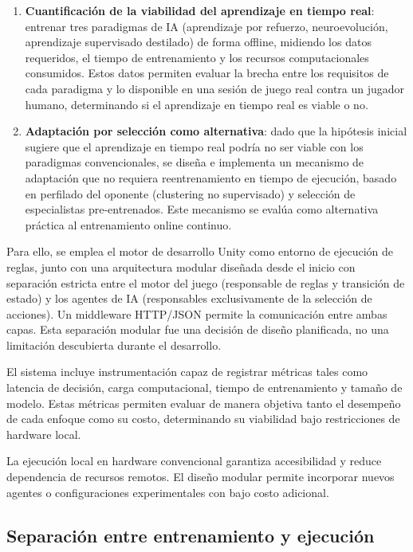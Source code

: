 \begin{enumerate}
    \item \textbf{Cuantificación de la viabilidad del aprendizaje en tiempo real}: entrenar tres paradigmas de IA (aprendizaje por refuerzo, neuroevolución, aprendizaje supervisado destilado) de forma offline, midiendo los datos requeridos, el tiempo de entrenamiento y los recursos computacionales consumidos. Estos datos permiten evaluar la brecha entre los requisitos de cada paradigma y lo disponible en una sesión de juego real contra un jugador humano, determinando si el aprendizaje en tiempo real es viable o no.
    \item \textbf{Adaptación por selección como alternativa}: dado que la hipótesis inicial sugiere que el aprendizaje en tiempo real podría no ser viable con los paradigmas convencionales, se diseña e implementa un mecanismo de adaptación que no requiera reentrenamiento en tiempo de ejecución, basado en perfilado del oponente (clustering no supervisado) y selección de especialistas pre-entrenados. Este mecanismo se evalúa como alternativa práctica al entrenamiento online continuo.
\end{enumerate}

Para ello, se emplea el motor de desarrollo Unity como entorno de ejecución de reglas, junto con una arquitectura modular diseñada desde el inicio con separación estricta entre el motor del juego (responsable de reglas y transición de estado) y los agentes de IA (responsables exclusivamente de la selección de acciones). Un middleware HTTP/JSON permite la comunicación entre ambas capas. Esta separación modular fue una decisión de diseño planificada, no una limitación descubierta durante el desarrollo.

El sistema incluye instrumentación capaz de registrar métricas tales como latencia de decisión, carga computacional, tiempo de entrenamiento y tamaño de modelo. Estas métricas permiten evaluar de manera objetiva tanto el desempeño de cada enfoque como su costo, determinando su viabilidad bajo restricciones de hardware local.


La ejecución local en hardware convencional garantiza accesibilidad y reduce dependencia de recursos remotos. El diseño modular permite incorporar nuevos agentes o configuraciones experimentales con bajo costo adicional.

\subsection{Separación entre entrenamiento y ejecución}

